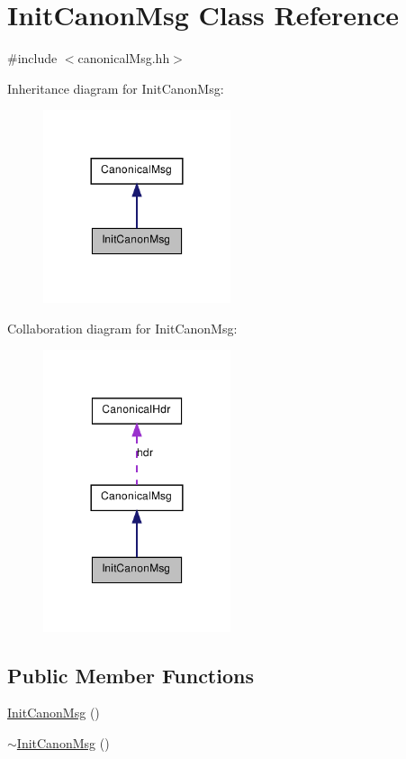 \hypertarget{class_init_canon_msg}{
\section{InitCanonMsg Class Reference}
\label{class_init_canon_msg}
}


{\ttfamily \#include $<$canonicalMsg.hh$>$}



Inheritance diagram for InitCanonMsg:\nopagebreak
\begin{figure}[H]
\begin{center}
\leavevmode
\includegraphics[width=156pt]{class_init_canon_msg__inherit__graph}
\end{center}
\end{figure}


Collaboration diagram for InitCanonMsg:\nopagebreak
\begin{figure}[H]
\begin{center}
\leavevmode
\includegraphics[width=156pt]{class_init_canon_msg__coll__graph}
\end{center}
\end{figure}
\subsection*{Public Member Functions}
\begin{DoxyCompactItemize}
\item 
\hyperlink{class_init_canon_msg_ae52bd54498afad4fb2b3a324e3f8e552}{InitCanonMsg} ()
\item 
\hyperlink{class_init_canon_msg_a11b3af1a51b6b3dc07357381fbde67a9}{$\sim$InitCanonMsg} ()
\end{DoxyCompactItemize}


